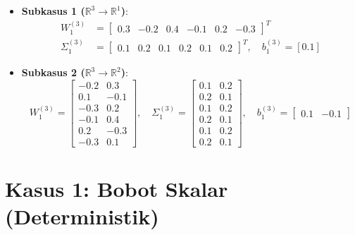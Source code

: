 \documentclass[11pt,a4paper]{article}
\def\mathbf#1{#1}%
\theoremstyle{plain}
\theoremstyle{definition}
\theoremstyle{remark}
\begin{document}
\begin{itemize}
    \item \textbf{Subkasus 1 ($\mathbb{R}^3 \to \mathbb{R}^1$)}:
    \begin{align}
        W^{(3)}_1 &= \begin{bmatrix} 0.3 & -0.2 & 0.4 & -0.1 & 0.2 & -0.3 \end{bmatrix}^T \\[0.2em]
        \Sigma^{(3)}_1 &= \begin{bmatrix} 0.1 & 0.2 & 0.1 & 0.2 & 0.1 & 0.2 \end{bmatrix}^T, \quad
        \mathbf{b}^{(3)}_1 = [0.1] \label{eq:init_beda_l3_r1}
    \end{align}
    \item \textbf{Subkasus 2 ($\mathbb{R}^3 \to \mathbb{R}^2$)}:
    \begin{equation}
        W^{(3)}_1 = \begin{bmatrix}
            -0.2 &  0.3 \\
             0.1 & -0.1 \\
            -0.3 &  0.2 \\
            -0.1 &  0.4 \\
             0.2 & -0.3 \\
            -0.3 &  0.1
        \end{bmatrix}, \quad
        \Sigma^{(3)}_1 = \begin{bmatrix}
            0.1 & 0.2 \\
            0.2 & 0.1 \\
            0.1 & 0.2 \\
            0.2 & 0.1 \\
            0.1 & 0.2 \\
            0.2 & 0.1
        \end{bmatrix}, \quad
        \mathbf{b}^{(3)}_1 = \begin{bmatrix} 0.1 & -0.1 \end{bmatrix} \label{eq:init_beda_l3_r2}
    \end{equation}
\end{itemize}

\clearpage
\section{Kasus 1: Bobot Skalar (Deterministik)}
\label{sec:bobot_skalar}
\end{document}
